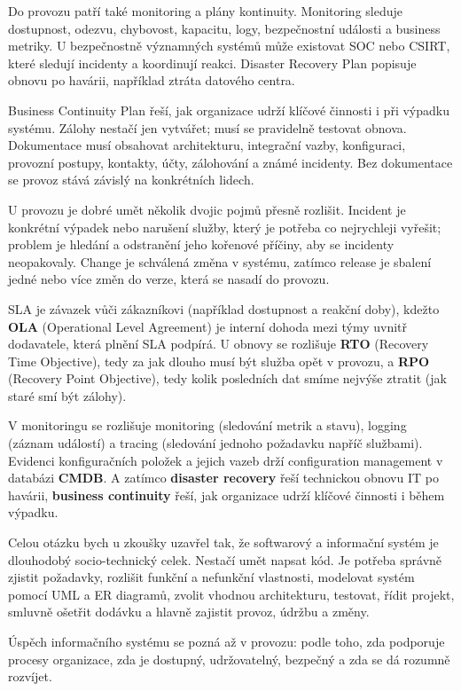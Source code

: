 \documentclass[11pt,a4paper]{article}
\begin{document}
Do provozu patří také monitoring a plány kontinuity. Monitoring sleduje dostupnost, odezvu, chybovost, kapacitu, logy, bezpečnostní události a business metriky. U bezpečnostně významných systémů může existovat SOC nebo CSIRT, které sledují incidenty a koordinují reakci. Disaster Recovery Plan popisuje obnovu po havárii, například ztráta datového centra.

Business Continuity Plan řeší, jak organizace udrží klíčové činnosti i při výpadku systému. Zálohy nestačí jen vytvářet; musí se pravidelně testovat obnova. Dokumentace musí obsahovat architekturu, integrační vazby, konfiguraci, provozní postupy, kontakty, účty, zálohování a známé incidenty. Bez dokumentace se provoz stává závislý na konkrétních lidech.

U provozu je dobré umět několik dvojic pojmů přesně rozlišit. Incident je konkrétní výpadek nebo narušení služby, který je potřeba co nejrychleji vyřešit; problem je hledání a odstranění jeho kořenové příčiny, aby se incidenty neopakovaly. Change je schválená změna v systému, zatímco release je sbalení jedné nebo více změn do verze, která se nasadí do provozu.

SLA je závazek vůči zákazníkovi (například dostupnost a reakční doby), kdežto \textbf{OLA} (Operational Level Agreement) je interní dohoda mezi týmy uvnitř dodavatele, která plnění SLA podpírá. U obnovy se rozlišuje \textbf{RTO} (Recovery Time Objective), tedy za jak dlouho musí být služba opět v provozu, a \textbf{RPO} (Recovery Point Objective), tedy kolik posledních dat smíme nejvýše ztratit (jak staré smí být zálohy).

V monitoringu se rozlišuje monitoring (sledování metrik a stavu), logging (záznam událostí) a tracing (sledování jednoho požadavku napříč službami). Evidenci konfiguračních položek a jejich vazeb drží configuration management v databázi \textbf{CMDB}. A zatímco \textbf{disaster recovery} řeší technickou obnovu IT po havárii, \textbf{business continuity} řeší, jak organizace udrží klíčové činnosti i během výpadku.

Celou otázku bych u zkoušky uzavřel tak, že softwarový a informační systém je dlouhodobý socio-technický celek. Nestačí umět napsat kód. Je potřeba správně zjistit požadavky, rozlišit funkční a nefunkční vlastnosti, modelovat systém pomocí UML a ER diagramů, zvolit vhodnou architekturu, testovat, řídit projekt, smluvně ošetřit dodávku a hlavně zajistit provoz, údržbu a změny.

Úspěch informačního systému se pozná až v provozu: podle toho, zda podporuje procesy organizace, zda je dostupný, udržovatelný, bezpečný a zda se dá rozumně rozvíjet.
\end{document}
